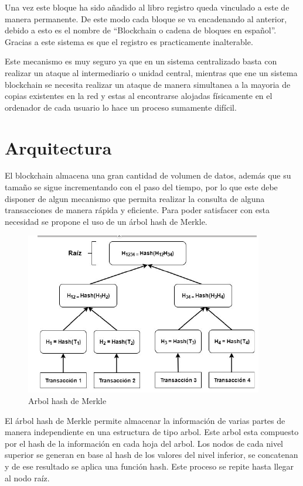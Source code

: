 \documentclass[conference]{IEEEtran}
\begin{document}
Una vez este bloque ha sido añadido al libro registro queda vinculado a este de manera permanente. De este modo cada bloque se va encadenando al anterior, debido a esto es el nombre de ``Blockchain o cadena de bloques en español''. Gracias a este sistema es que el registro es practicamente inalterable.

Este mecanismo es muy seguro ya que en un sistema centralizado basta con realizar un ataque al intermediario o unidad central, mientras que ene un sistema blockchain se necesita realizar un ataque de manera simultanea a la mayoria de copias existentes en la red y estas al encontrarse alojadas físicamente en el ordenador de cada usuario lo hace un proceso sumamente difícil.


\section{Arquitectura}

El blockchain almacena una gran cantidad de volumen de datos, además que su tamaño se sigue incrementando con el paso del tiempo, por lo que este debe disponer de algun mecanismo que permita realizar la consulta de alguna transacciones de manera rápida y eficiente. Para poder satisfacer con esta necesidad se propone el uso de un árbol hash de Merkle. \cite{blockchain2}

\begin{figure}[htbp]
    \centering
    \includegraphics[scale=.75]{assets/images/arbol-hash.png}
    \caption{Arbol hash de Merkle}
\end{figure}

El árbol hash de Merkle permite almacenar la información de varias partes de manera independiente en una estructura de tipo arbol. Este arbol esta compuesto por el hash de la información en cada hoja del arbol. Los nodos de cada nivel superior se generan en base al hash de los valores del nivel inferior, se concatenan y de ese resultado se aplica una función hash. Este proceso se repite hasta llegar al nodo raíz.
\end{document}
